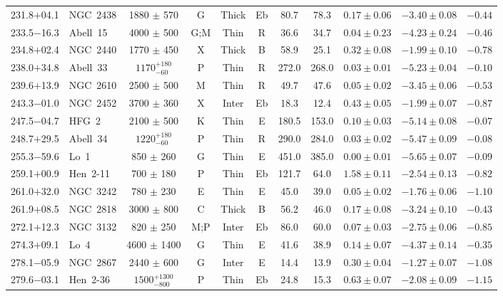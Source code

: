 \documentclass[useAMS]{mn2e}
\begin{document}
\begin{center}
{\begin{longtable}{llccccccccc}
231.8$+$04.1		&	NGC~2438	&	1880	$\pm$	570	&	G		&	Thick		&	Eb		&	80.7		&	78.3		&	$0.17 \pm 0.06$		&	$-3.40 \pm 0.08$		&	$-0.44$	\\
233.5$-$16.3		&	Abell~15	&	4000	$\pm$	500	&	G;M		&	Thin		&	R		&	36.6		&	34.7		&	$0.04 \pm 0.23$		&	$-4.23 \pm 0.24$		&	$-0.46$	\\
234.8$+$02.4		&	NGC~2440	&	1770	$\pm$	450	&	X		&	Thick		&	B		&	58.9		&	25.1		&	$0.32 \pm 0.08$		&	$-1.99 \pm 0.10$		&	$-0.78$	\\
238.0$+$34.8		&	Abell~33	&	$1170^{+180}_{-60}$		&	P		&	Thin		&	R		&	272.0		&	268.0		&	$0.03 \pm 0.01$		&	$-5.23 \pm 0.04$		&	$-0.10$	\\
239.6$+$13.9		&	NGC~2610	&	2500	$\pm$	500	&	M		&	Thin		&	R		&	49.7		&	47.6		&	$0.05 \pm 0.02$		&	$-3.45 \pm 0.06$		&	$-0.53$	\\
243.3$-$01.0		&	NGC~2452	&	3700	$\pm$	360	&	X		&	Inter		&	Eb		&	18.3		&	12.4		&	$0.43 \pm 0.05$		&	$-1.99 \pm 0.07$		&	$-0.87$	\\
247.5$-$04.7		&	HFG~2	&	2100	$\pm$	500	&	K		&	Thin		&	E		&	180.5		&	153.0		&	$0.10 \pm 0.03$		&	$-5.14 \pm 0.08$		&	$-0.07$	\\
248.7$+$29.5		&	Abell~34	&	$1220^{+180}_{-60}$		&	P		&	Thin		&	R		&	290.0		&	284.0		&	$0.03 \pm 0.02$		&	$-5.47 \pm 0.09$		&	$-0.08$	\\
255.3$-$59.6		&	Lo~1	&	850	$\pm$	260	&	G		&	Thin		&	E		&	451.0		&	385.0		&	$0.00 \pm 0.01$		&	$-5.65 \pm 0.07$		&	$-0.09$	\\
259.1$+$00.9		&	Hen~2-11	&	700	$\pm$	180	&	P		&	Thin		&	Eb		&	121.7		&	64.0		&	$1.58 \pm 0.11$		&	$-2.54 \pm 0.13$		&	$-0.82$	\\
261.0$+$32.0		&	NGC~3242	&	780	$\pm$	230	&	E		&	Thin		&	E		&	45.0		&	39.0		&	$0.05 \pm 0.02$		&	$-1.76 \pm 0.06$		&	$-1.10$	\\
261.9$+$08.5		&	NGC~2818	&	3000	$\pm$	800	&	C		&	Thick		&	B		&	56.2		&	46.0		&	$0.17 \pm 0.08$		&	$-3.24 \pm 0.10$		&	$-0.43$	\\
272.1$+$12.3		&	NGC~3132	&	820	$\pm$	250	&	M;P		&	Inter		&	Eb		&	86.0		&	60.0		&	$0.07 \pm 0.03$		&	$-2.75 \pm 0.06$		&	$-0.85$	\\
274.3$+$09.1		&	Lo~4	&	4600	$\pm$	1400	&	G		&	Thin		&	E		&	41.6		&	38.9		&	$0.14 \pm 0.07$		&	$-4.37 \pm 0.14$		&	$-0.35$	\\
278.1$-$05.9		&	NGC~2867	&	2440	$\pm$	600	&	G		&	Inter		&	E		&	14.4		&	13.9		&	$0.30 \pm 0.04$		&	$-1.27 \pm 0.07$		&	$-1.08$	\\
279.6$-$03.1		&	Hen~2-36	&	$1500^{+1300}_{-800}$		&	P		&	Thin 		&	Eb		&	24.8		&	15.3		&	$0.63 \pm 0.07$		&	$-2.08 \pm 0.09$		&	$-1.15$	\\

\end{longtable}}
\end{center}
\end{document}
